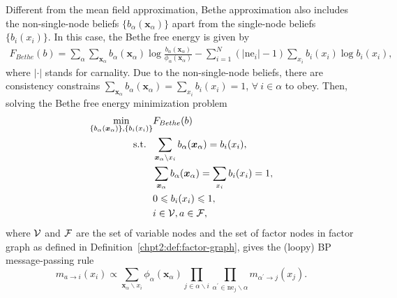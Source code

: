 Different from the mean field approximation, Bethe approximation also includes the non-single-node beliefs $\{b_{\alpha}(\bm{x}_{\alpha})\}$ apart from the single-node beliefs $\{b_i(x_i)\}$\cite{yedidia2003understanding}. In this case, the Bethe free energy is given by
\begin{align}\label{apdix:bethe-free-energy}
  F_{Bethe}(b) = \sum_{\alpha} \sum_{\bm{x}_{\alpha}}
  b_{\alpha}(\bm{x}_{\alpha})\log{\frac{b_{\alpha}(\bm{x}_{\alpha})}{\phi_{\alpha}(\bm{x}_{\alpha})}
  } -  \sum_{i=1}^{N} (|\mathrm{ne}_i| - 1) \sum_{x_i} b_i(x_i) \log{b_i(x_i)},
\end{align}
where $|\cdot|$ stands for carnality.
Due to the  non-single-node beliefs, there are consistency constrains $\sum_{\bm{x}_{\alpha}} b_{\alpha}(\bm{x}_{\alpha}) = \sum_{ x_i} b_i({x}_i) =1$, $\forall~ i \in \alpha$ to obey. Then, solving the Bethe free energy minimization problem
\begin{align}
  \min_{\{b_{\alpha}(\bm{x}_{\alpha})\}, \{b_i(x_i)\}}& F_{Bethe}(b) \nonumber \\
  \mathrm{s.t.}~~ & \sum_{\bm{x}_{\alpha} \backslash x_i} b_{\alpha}(\bm{x}_{\alpha})  =
                    b_i(x_i), \nonumber \\
                                                      & \sum_{\bm{x}_{\alpha}} b_{\alpha}(\bm{x}_{\alpha}) = \sum_{ x_i} b_i({x}_i) =1,
                                                        \nonumber \\
                                                      &  0 \leqslant b_i(x_i) \leqslant 1,  \nonumber \\
                                                      & i \in \mathcal{V} , a \in \mathcal{F},
\end{align}
where $\mathcal{V}$ and $\mathcal{F}$ are the set of variable nodes and the set of
factor nodes in factor graph as defined in
Definition~\ref{chpt2:def:factor-graph}, gives the (loopy) BP message-passing rule
\begin{equation}
  m_{a\rightarrow i}(x_i) \propto \sum_{\bm{x}_{\alpha} \backslash x_i}
  \phi_{\alpha}(\bm{x}_{\alpha}) \prod_{j \in \alpha \backslash i} \prod_{\alpha^{\prime} \in \mathrm{ne}_j
    \backslash \alpha} m_{\alpha^{\prime}\rightarrow j}(x_j).
\end{equation}


